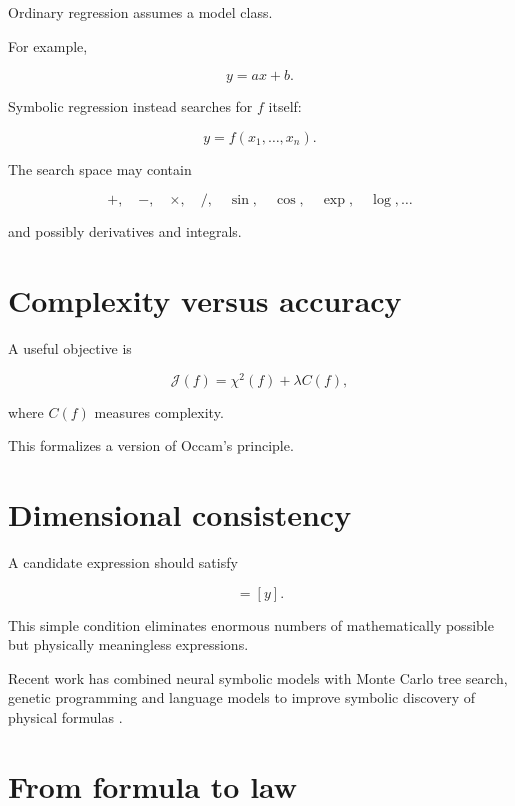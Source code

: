\documentclass[11pt,a4paper,oneside]{book}
\begin{document}
Ordinary regression assumes a model class.

For example,

\begin{equation}
y=ax+b.
\end{equation}

Symbolic regression instead searches for $f$ itself:

\begin{equation}
y=f(x_1,\ldots,x_n).
\end{equation}

The search space may contain

\begin{equation}
+,\quad -,\quad \times,\quad /,\quad
\sin,\quad \cos,\quad \exp,\quad \log,\ldots
\end{equation}

and possibly derivatives and integrals.

\section{Complexity versus accuracy}

A useful objective is

\begin{equation}
\mathcal{J}(f)
=
\chi^2(f)
+
\lambda C(f),
\end{equation}

where $C(f)$ measures complexity.

This formalizes a version of Occam's principle.

\section{Dimensional consistency}

A candidate expression should satisfy

\begin{equation}
[f]=[y].
\end{equation}

This simple condition eliminates enormous numbers of mathematically possible
but physically meaningless expressions.

Recent work has combined neural symbolic models with Monte Carlo tree search,
genetic programming and language models to improve symbolic discovery of
physical formulas \citep{Ying2025}.

\section{From formula to law}
\end{document}
